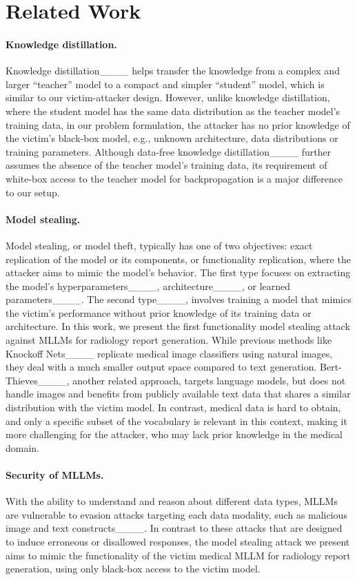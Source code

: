 \section{Related Work}
\paragraph{Knowledge distillation.}
Knowledge distillation____ helps transfer the knowledge from a complex and larger ``teacher'' model to a compact and simpler ``student'' model, which is similar to our victim-attacker design. 
However, unlike knowledge distillation, where the student model has the same data distribution as the teacher model's training data, in our problem formulation, the attacker has no prior knowledge of the victim's black-box model, e.g., unknown architecture, data distributions or training parameters. 
Although data-free knowledge distillation____ further assumes the absence of the teacher model's training data, its requirement of white-box access to the teacher model for backpropagation is a major difference to our setup.
\paragraph{Model stealing.}
Model stealing, or model theft, typically has one of two objectives: exact replication of the model or its components, or functionality replication, where the attacker aims to mimic the model's behavior.
The first type focuses on extracting the model's hyperparameters____, architecture____, or learned parameters____. The second type____, involves training a model that mimics the victim's performance without prior knowledge of its training data or architecture.
In this work, we present the first functionality model stealing attack against \acp{MLLM} for radiology report generation. While previous methods like Knockoff Nets____ replicate medical image classifiers using natural images, they deal with a much smaller output space compared to text generation. Bert-Thieves____, another related approach, targets language models, but does not handle images and benefits from publicly available text data that shares a similar distribution with the victim model.
In contrast, medical data is hard to obtain, and only a specific subset of the vocabulary is relevant in this context, making it more challenging for the attacker, who may lack prior knowledge in the medical domain.
\paragraph{Security of \aclp{MLLM}.}
With the ability to understand and reason about different data types, \acp{MLLM} are vulnerable to evasion attacks targeting each data modality, such as malicious image and text constructs____.
In contrast to these attacks that are designed to induce erroneous or disallowed responses, the model stealing attack we present aims to mimic the functionality of the victim medical \ac{MLLM} for radiology report generation, using only black-box access to the victim model.

